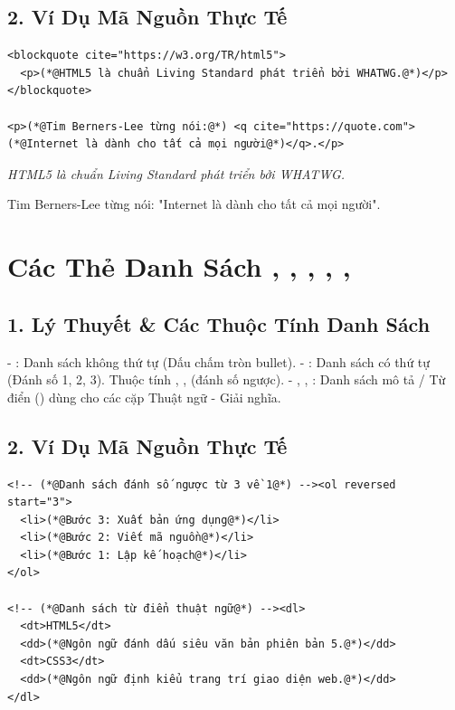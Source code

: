 \subsection{2. Ví Dụ Mã Nguồn Thực Tế}
\begin{codeWindow}
\begin{lstlisting}[language=HTML5]
<blockquote cite="https://w3.org/TR/html5">
  <p>(*@HTML5 là chuẩn Living Standard phát triển bởi WHATWG.@*)</p>
</blockquote>

<p>(*@Tim Berners-Lee từng nói:@*) <q cite="https://quote.com">(*@Internet là dành cho tất cả mọi người@*)</q>.</p>
\end{lstlisting}
\end{codeWindow}

\begin{browserWindow}
\sffamily\small
\begin{tcolorbox}[colback=primaryBlue!4, colframe=primaryBlue!40, leftrule=3pt, boxrule=0pt, arc=0pt]
\textit{HTML5 là chuẩn Living Standard phát triển bởi WHATWG.}
\end{tcolorbox}
Tim Berners-Lee từng nói: "Internet là dành cho tất cả mọi người".
\end{browserWindow}

\section{Các Thẻ Danh Sách , , , , , }
\subsection{1. Lý Thuyết \& Các Thuộc Tính Danh Sách}
- : Danh sách không thứ tự (Dấu chấm tròn bullet).
- : Danh sách có thứ tự (Đánh số 1, 2, 3). Thuộc tính , ,  (đánh số ngược).
- , , : Danh sách mô tả / Từ điển () dùng cho các cặp Thuật ngữ - Giải nghĩa.

\subsection{2. Ví Dụ Mã Nguồn Thực Tế}
\begin{codeWindow}
\begin{lstlisting}[language=HTML5]
<!-- (*@Danh sách đánh số ngược từ 3 về 1@*) --><ol reversed start="3">
  <li>(*@Bước 3: Xuất bản ứng dụng@*)</li>
  <li>(*@Bước 2: Viết mã nguồn@*)</li>
  <li>(*@Bước 1: Lập kế hoạch@*)</li>
</ol>

<!-- (*@Danh sách từ điển thuật ngữ@*) --><dl>
  <dt>HTML5</dt>
  <dd>(*@Ngôn ngữ đánh dấu siêu văn bản phiên bản 5.@*)</dd>
  <dt>CSS3</dt>
  <dd>(*@Ngôn ngữ định kiểu trang trí giao diện web.@*)</dd>
</dl>
\end{lstlisting}
\end{codeWindow}

